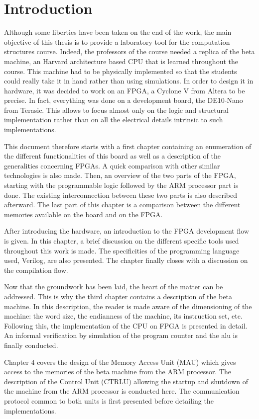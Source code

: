 \chapter*{Introduction}

Although some liberties have been taken on the end of the work, the main objective of this thesis
is to provide a laboratory tool for the computation structures course. Indeed, the professors of 
the course needed a replica of the beta machine, an Harvard architecture based CPU that is learned
throughout the course. This machine had to be physically implemented so that the students could 
really take it in hand rather than using simulations. In order to design it in hardware, it was 
decided to work on an FPGA, a Cyclone V from Altera to be precise. In fact, everything was done on a 
development board, the DE10-Nano from Terasic. This allows to focus almost only on the logic and 
structural implementation rather than on all the electrical details intrinsic to such 
implementations.

This document therefore starts with a first chapter containing an enumeration of the different 
functionalities of this board as well as a description of the generalities concerning FPGAs. A quick 
comparison with other similar technologies is also made. Then, an overview of the two parts of the 
FPGA, starting with the programmable logic followed by the ARM processor part is done. The existing 
interconnection between these two parts is also described afterward. The last part of this chapter 
is a comparison between the different memories available on the board and on the FPGA.

After introducing the hardware, an introduction to the FPGA development flow is 
given. In this chapter, a brief discussion on the different specific tools used throughout this work 
is made. The specificities of the programming language used, Verilog, are also presented. The
chapter finally closes with a discussion on the compilation flow.

Now that the groundwork has been laid, the heart of the matter can be addressed. This is why the 
third chapter contains a description of the beta machine. In this description, the reader is 
made aware of the dimensioning of the machine: the word size, the endianness of the machine, its 
instruction set, etc. Following this, the implementation of the CPU on FPGA is presented in detail. 
An informal verification by simulation of the program counter and the alu is finally conducted.

Chapter 4 covers the design of the Memory Access Unit (MAU) which gives access to the memories of 
the beta machine from the ARM processor. The description of the Control Unit (CTRLU) allowing the 
startup and shutdown of the machine from the ARM processor is conducted here. The communication 
protocol common to both units is first presented before detailing the implementations. 

